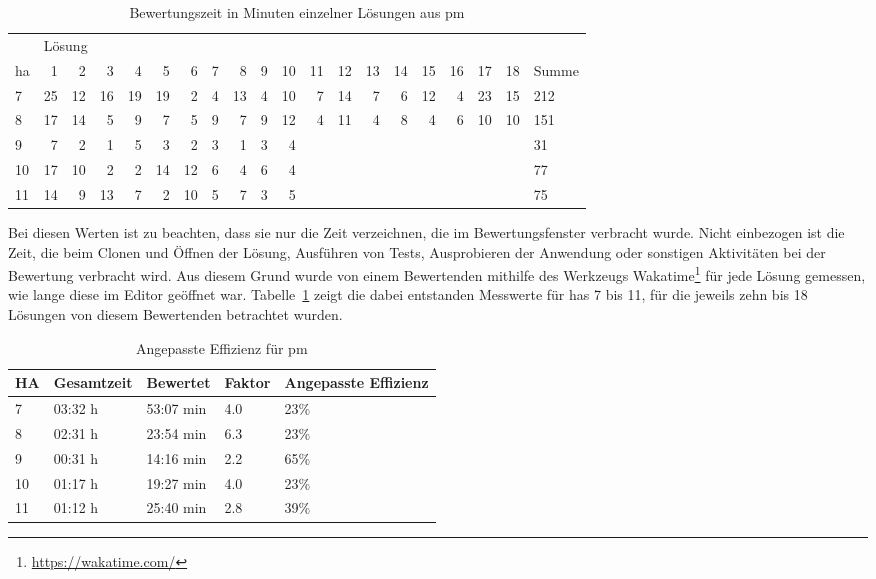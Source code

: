 \begin{table}
    \centering
    \caption{Bewertungszeit in Minuten einzelner Lösungen aus \ac{pm}}
    \begin{tabular}{|l|r|r|r|r|r|r|r|r|r|r|r|r|r|r|r|r|r|r|l|}
    \hline
        ~ & \multicolumn{18}{l|}{Lösung} & ~ \\
        \acs{ha} & 1  & 2  & 3  & 4  & 5  & 6  & 7 & 8  & 9 & 10 & 11 & 12 & 13 & 14 & 15 & 16 & 17 & 18 & Summe \\ \hline
        7  & 25 & 12 & 16 & 19 & 19 & 2  & 4 & 13 & 4 & 10 & 7  & 14 & 7  & 6  & 12 & 4  & 23 & 15 & 212   \\ \hline
        8  & 17 & 14 & 5  & 9  & 7  & 5  & 9 & 7  & 9 & 12 & 4  & 11 & 4  & 8  & 4  & 6  & 10 & 10 & 151   \\ \hline
        9  & 7  & 2  & 1  & 5  & 3  & 2  & 3 & 1  & 3 & 4  & ~  & ~  & ~  & ~  & ~  & ~  & ~  & ~  & 31    \\ \hline
        10 & 17 & 10 & 2  & 2  & 14 & 12 & 6 & 4  & 6 & 4  & ~  & ~  & ~  & ~  & ~  & ~  & ~  & ~  & 77    \\ \hline
        11 & 14 & 9  & 13 & 7  & 2  & 10 & 5 & 7  & 3 & 5  & ~  & ~  & ~  & ~  & ~  & ~  & ~  & ~  & 75    \\ \hline
    \end{tabular}
    \label{tbl:pm-overhead}
\end{table}

Bei diesen Werten ist zu beachten, dass sie nur die Zeit verzeichnen, die im Bewertungsfenster verbracht wurde.
Nicht einbezogen ist die Zeit, die beim Clonen und Öffnen der Lösung, Ausführen von Tests, Ausprobieren der Anwendung oder sonstigen Aktivitäten bei der Bewertung verbracht wird.
Aus diesem Grund wurde von einem Bewertenden mithilfe des Werkzeugs Wakatime\footnote{
    \url{https://wakatime.com/}
} für jede Lösung gemessen, wie lange diese im Editor geöffnet war.
Tabelle~\ref{tbl:pm-overhead} zeigt die dabei entstanden Messwerte für \acp{ha} 7 bis 11, für die jeweils zehn bis 18 Lösungen von diesem Bewertenden betrachtet wurden.

\begin{table}
    \centering
    \caption{Angepasste Effizienz für \ac{pm}}
    \begin{tabular}{|l|l|l|l|l|}
    \hline
        HA & Gesamtzeit  & Bewertet  & Faktor  & Angepasste Effizienz  \\ \hline
        7  & 03:32 h & 53:07 min & 4.0 & 23\% \\ \hline
        8  & 02:31 h & 23:54 min & 6.3 & 23\% \\ \hline
        9  & 00:31 h & 14:16 min & 2.2 & 65\% \\ \hline
        10 & 01:17 h & 19:27 min & 4.0 & 23\% \\ \hline
        11 & 01:12 h & 25:40 min & 2.8 & 39\% \\ \hline
    \end{tabular}
    \label{tbl:pm-adapted-efficiency}
\end{table}

